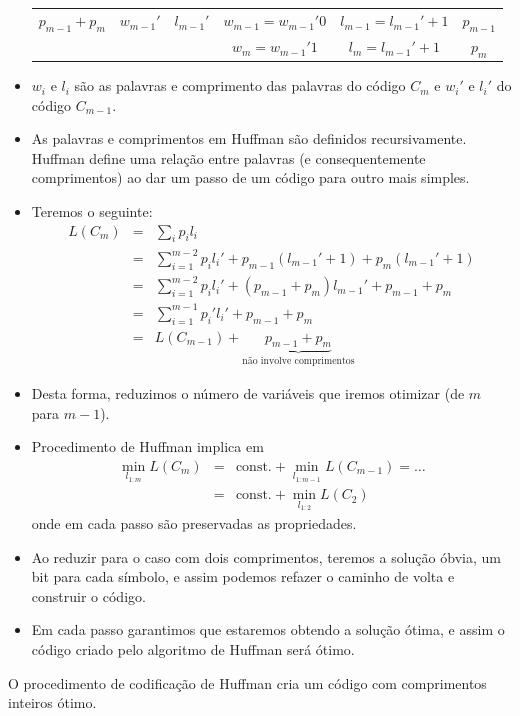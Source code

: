 \begin{frame}[allowframebreaks]
\begin{itemize}
\begin{tabular}{cccccc}
	$p_{m-1} + p_m$   & $w_{m-1}'$        & $l_{m-1}'$        & $w_{m-1} = w_{m-1}' 0$  & $l_{m-1} = l_{m-1}'+1$  & $p_{m-1}$ \\
		& 	& 	& $w_{m} = w_{m-1}' 1$ & $l_m = l_{m-1}'+1$ & $p_m$
	\end{tabular}
  \item $w_i$ e $l_i$ são as palavras e comprimento das palavras do código $C_m$ e $w_i'$ e $l_i'$ do código $C_{m-1}$.
  \item As palavras e comprimentos em Huffman são definidos recursivamente. Huffman define uma relação entre palavras 
	(e consequentemente comprimentos) ao dar um passo de um código para outro mais simples.
  \item Teremos o seguinte:
	\begin{eqnarray}
	L(C_m) &=& \sum_i p_i l_i \nonumber \\
		&=& \sum_{i=1}^{m-2} p_i l_i' + p_{m-1} (l_{m-1}' + 1) + p_m (l_{m-1}' + 1) \nonumber \\
		&=& \sum_{i=1}^{m-2} p_i l_i' + (p_{m-1} + p_m) l_{m-1}' + p_{m-1} + p_m \nonumber \\
		&=& \sum_{i=1}^{m-1} p_i' l_i'+ p_{m-1} + p_m \nonumber \\
		&=& L(C_{m-1}) + \underbrace{p_{m-1} + p_m}_{\text{não involve comprimentos}}
	\end{eqnarray}
  \item Desta forma, reduzimos o número de variáveis que iremos otimizar (de $m$ para $m-1$).
  \item Procedimento de Huffman implica em
	\begin{eqnarray}
	\min_{l_{1:m}} L(C_m) &=& \text{const.} + \min_{l_{1:m-1}} L(C_{m-1}) = \ldots \nonumber \\
			&=& \text{const.} + \min_{l_{1:2}} L(C_{2})
	\end{eqnarray}
	onde em cada passo são preservadas as propriedades.
  \item Ao reduzir para o caso com dois comprimentos, teremos a solução óbvia, um bit para cada símbolo, e assim
	podemos refazer o caminho de volta e construir o código.
  \item Em cada passo garantimos que estaremos obtendo a solução ótima, e assim o código criado pelo algoritmo de Huffman
	será ótimo.
  \end{itemize}

  \begin{theorem}
  O procedimento de codificação de Huffman cria um código com comprimentos inteiros ótimo.
  \end{theorem}


\end{frame}
